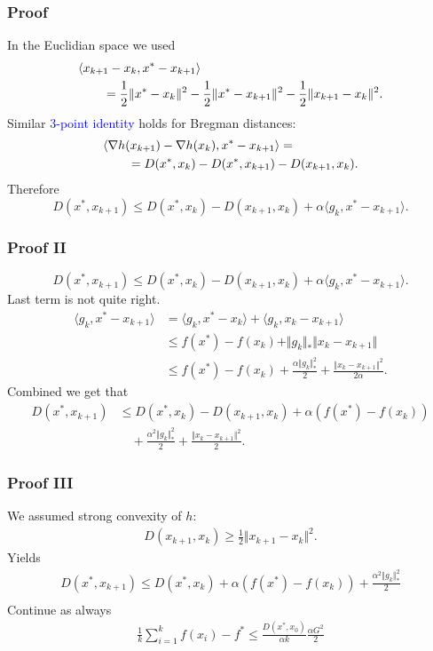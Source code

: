 \documentclass{beamer}
\begin{document}
\begin{frame}
  \frametitle{Proof}
  In the Euclidian space we used
  \begin{align}
    \MoveEqLeft \langle x_{k+1}-x_k, x^* -x_{k+1} \rangle \\
    &= \frac12 \Vert x^*-x_k \Vert^2 - \frac12 \Vert x^*-x_{k+1} \Vert^2 - \frac12 \Vert x_{k+1}-x_k \Vert^2.
  \end{align}
  Similar \textcolor{blue}{$3$-point identity} holds for Bregman distances:
  \begin{align}
    \MoveEqLeft \langle \nabla h(x_{k+1})-\nabla h(x_k), x^*-x_{k+1} \rangle =\\
    &= D(x^*, x_k) - D(x^*, x_{k+1}) - D(x_{k+1}, x_k).
  \end{align}
  Therefore
  \begin{equation}
    D(x^*, x_{k+1}) \le  D(x^*, x_k) - D(x_{k+1}, x_k) + \alpha \langle g_k, x^*-x_{k+1} \rangle.
  \end{equation}
\end{frame}


\begin{frame}
  \frametitle{Proof II}
  \begin{equation}
    D(x^*, x_{k+1}) \le  D(x^*, x_k) - D(x_{k+1}, x_k) + \alpha \langle g_k, x^*-x_{k+1} \rangle.
  \end{equation}
  Last term is not quite right.
  \begin{align}
    \langle g_k, x^*-x_{k+1} \rangle &= \langle g_k, x^*-x_k \rangle + \langle g_k, x_k-x_{k+1} \rangle \\
                         &\le f(x^*)-f(x_k) + \Vert g_k \Vert_* \Vert x_k-x_{k+1} \Vert \\
    &\le f(x^*)-f(x_k) + \frac{\alpha \Vert g_k \Vert_*^2}{2} + \frac{\Vert x_k-x_{k+1} \Vert^2}{2 \alpha}.
  \end{align}
  Combined we get that
  \begin{align}
    D(x^*, x_{k+1}) &\le  D(x^*, x_k) - D(x_{k+1}, x_k) + \alpha (f(x^*)-f(x_k)) \\
    &\quad+ \frac{\alpha^2 \Vert g_k \Vert_*^2}{2} + \frac{\Vert x_k-x_{k+1} \Vert^2}{2}.
  \end{align}
\end{frame}


\begin{frame}
  \frametitle{Proof III}
  We assumed strong convexity of $h$:
  \begin{align}
    D(x_{k+1}, x_k) \ge \frac12 \Vert x_{k+1}-x_k \Vert^2.
  \end{align}
  Yields
  \begin{align}
    D(x^*, x_{k+1}) \le  D(x^*, x_k) + \alpha (f(x^*)-f(x_k))  + \frac{\alpha^2 \Vert g_k \Vert_*^2}{2} \\
  \end{align}
  Continue as always
  \begin{align}
    \frac{1}{k} \sum_{i=1}^{k} f(x_i) - f^* \le \frac{D(x^*, x_0)}{\alpha k}
    \frac{\alpha G^2}{2} \\
  \end{align}
\end{frame}
\end{document}
